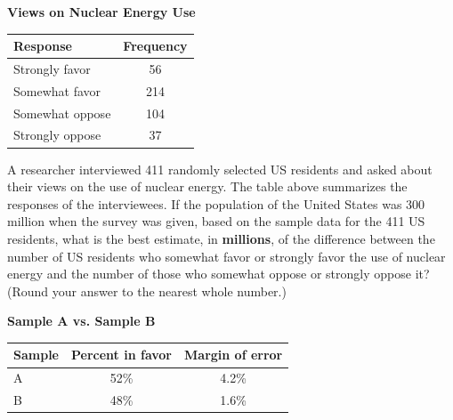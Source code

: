 \newpage
\noindent\markforreview

\begin{center}
    

\textbf{Views on Nuclear Energy Use}

\vspace{0.4em}

\begin{tabular}{|l|c|}
\hline
Response & Frequency \\
\hline
Strongly favor & 56 \\
Somewhat favor & 214 \\
Somewhat oppose & 104 \\
Strongly oppose & 37 \\
\hline
\end{tabular}
\end{center}

\vspace{1em}

A researcher interviewed 411 randomly selected US residents and asked about their views on the use of nuclear energy.  
The table above summarizes the responses of the interviewees.  
If the population of the United States was 300 million when the survey was given, based on the sample data for the 411 US residents,  
what is the best estimate, in \textbf{millions}, of the difference between the number of US residents who somewhat favor or strongly favor  
the use of nuclear energy and the number of those who somewhat oppose or strongly oppose it?  
(Round your answer to the nearest whole number.)

\vspace{0.75em}

\vspace{2em}




\noindent\markforreview


\begin{center}
    

\textbf{Sample A vs. Sample B}

\vspace{0.4em}
\begin{tabular}{|l|c|c|}
\hline
Sample & Percent in favor & Margin of error \\
\hline
A & 52\% & 4.2\% \\
B & 48\% & 1.6\% \\
\hline
\end{tabular}

\end{center}

